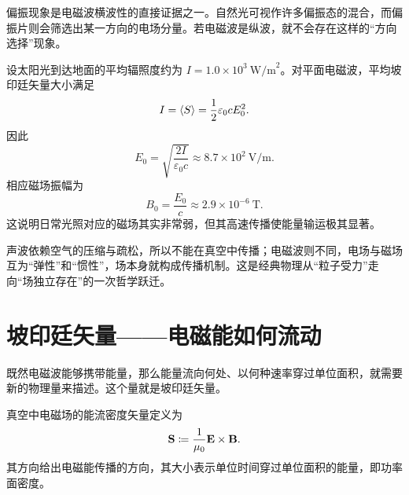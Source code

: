 偏振现象是电磁波横波性的直接证据之一。自然光可视作许多偏振态的混合，而偏振片则会筛选出某一方向的电场分量。若电磁波是纵波，就不会存在这样的“方向选择”现象。

\begin{example}[太阳光辐照下的场强估算]
设太阳光到达地面的平均辐照度约为 $I=1.0\times 10^3\ \text{W/m}^2$。对平面电磁波，平均坡印廷矢量大小满足
\[
I=\langle S \rangle=\frac{1}{2}\varepsilon_0 c E_0^2.
\]
因此
\[
E_0=\sqrt{\frac{2I}{\varepsilon_0 c}}\approx 8.7\times10^2\ \text{V/m}.
\]
相应磁场振幅为
\[
B_0=\frac{E_0}{c}\approx 2.9\times10^{-6}\ \text{T}.
\]
这说明日常光照对应的磁场其实非常弱，但其高速传播使能量输运极其显著。
\end{example}

\begin{center}
\end{center}

\begin{remark}
声波依赖空气的压缩与疏松，所以不能在真空中传播；电磁波则不同，电场与磁场互为“弹性”和“惯性”，场本身就构成传播机制。这是经典物理从“粒子受力”走向“场独立存在”的一次哲学跃迁。
\end{remark}

\section{坡印廷矢量——电磁能如何流动}

既然电磁波能够携带能量，那么能量流向何处、以何种速率穿过单位面积，就需要新的物理量来描述。这个量就是坡印廷矢量。

\begin{definition}[坡印廷矢量]
真空中电磁场的能流密度矢量定义为
\[
\vb{S}\coloneqq \frac{1}{\mu_0}\vb{E}\times\vb{B}.
\]
其方向给出电磁能传播的方向，其大小表示单位时间穿过单位面积的能量，即功率面密度。
\end{definition}

